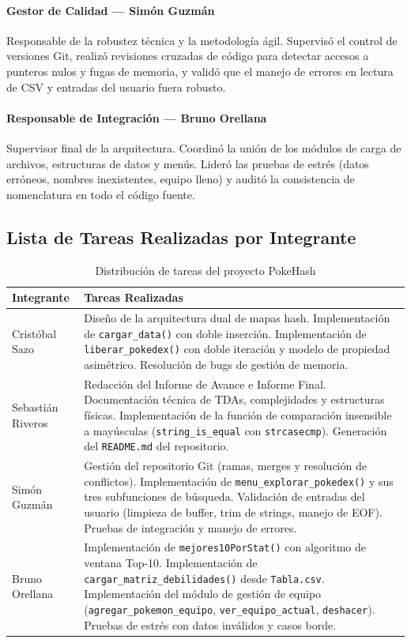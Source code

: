 \documentclass[12pt, letterpaper]{article}
\begin{document}
\paragraph{Gestor de Calidad --- Simón Guzmán}
Responsable de la robustez técnica y la metodología ágil. Supervisó el control de versiones Git, realizó revisiones cruzadas de código para detectar accesos a punteros nulos y fugas de memoria, y validó que el manejo de errores en lectura de CSV y entradas del usuario fuera robusto.

\paragraph{Responsable de Integración --- Bruno Orellana}
Supervisor final de la arquitectura. Coordinó la unión de los módulos de carga de archivos, estructuras de datos y menús. Lideró las pruebas de estrés (datos erróneos, nombres inexistentes, equipo lleno) y auditó la consistencia de nomenclatura en todo el código fuente.

\subsection{Lista de Tareas Realizadas por Integrante}

\begin{table}[H]
\centering
\caption{Distribución de tareas del proyecto PokeHash}
\renewcommand{\arraystretch}{1.4}
\begin{tabularx}{\textwidth}{@{}lX@{}}
\toprule
\textbf{Integrante} & \textbf{Tareas Realizadas} \\
\midrule
Cristóbal Sazo &
Diseño de la arquitectura dual de mapas hash.
Implementación de \texttt{cargar\_data()} con doble inserción.
Implementación de \texttt{liberar\_pokedex()} con doble iteración y modelo de propiedad asimétrico.
Resolución de bugs de gestión de memoria. \\
\midrule
Sebastián Riveros &
Redacción del Informe de Avance e Informe Final.
Documentación técnica de TDAs, complejidades y estructuras físicas.
Implementación de la función de comparación insensible a mayúsculas (\texttt{string\_is\_equal} con \texttt{strcasecmp}).
Generación del \texttt{README.md} del repositorio. \\
\midrule
Simón Guzmán &
Gestión del repositorio Git (ramas, merges y resolución de conflictos).
Implementación de \texttt{menu\_explorar\_pokedex()} y sus tres subfunciones de búsqueda.
Validación de entradas del usuario (limpieza de buffer, trim de strings, manejo de EOF).
Pruebas de integración y manejo de errores. \\
\midrule
Bruno Orellana &
Implementación de \texttt{mejores10PorStat()} con algoritmo de ventana Top-10.
Implementación de \texttt{cargar\_matriz\_debilidades()} desde \texttt{Tabla.csv}.
Implementación del módulo de gestión de equipo (\texttt{agregar\_pokemon\_equipo}, \texttt{ver\_equipo\_actual}, \texttt{deshacer}).
Pruebas de estrés con datos inválidos y casos borde. \\
\bottomrule
\end{tabularx}
\end{table}
\end{document}
